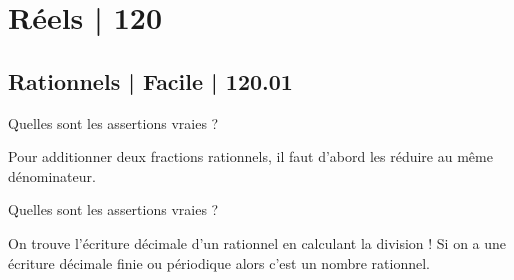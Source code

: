 



\section{Réels | 120}

\subsection{Rationnels | Facile | 120.01}

\begin{question}
Quelles sont les assertions vraies ?
\begin{answers}



   
\end{answers}
\begin{explanations}
Pour additionner deux fractions rationnels, il faut d'abord les réduire au même dénominateur.
\end{explanations}
\end{question}


\begin{question}
Quelles sont les assertions vraies ?
\begin{answers}



   
\end{answers}
\begin{explanations}
On trouve l'écriture décimale d'un rationnel en calculant la division !
Si on a une écriture décimale finie ou périodique alors c'est un nombre rationnel.
\end{explanations}
\end{question}


